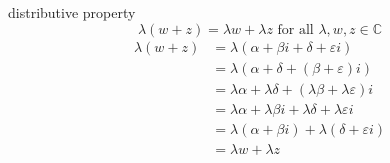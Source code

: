 \documentclass[11pt]{book}
\begin{document}
\begin{ver}
    distributive property
    \begin{equation*}
        \lambda\left(w + z\right) = \lambda w + \lambda z \text{ for all  } \lambda, w, z \in \mathbb{C}    
    \end{equation*}
    \begin{align*}
        \lambda\left( w + z \right) &= \lambda \left( \alpha + \beta i + \delta + \varepsilon i \right) \\
                                    &= \lambda\left(\alpha + \delta + \left( \beta + \varepsilon \right)i\right) \\
                                    &= \lambda \alpha + \lambda \delta + \left( \lambda \beta + \lambda\varepsilon \right)i \\
                                    &= \lambda \alpha + \lambda \beta i + \lambda \delta + \lambda \varepsilon i \\
                                    &= \lambda \left( \alpha + \beta i \right) + \lambda \left( \delta + \varepsilon i \right) \\
                                    &= \lambda w + \lambda z
    \end{align*}
\end{ver}
\end{document}
